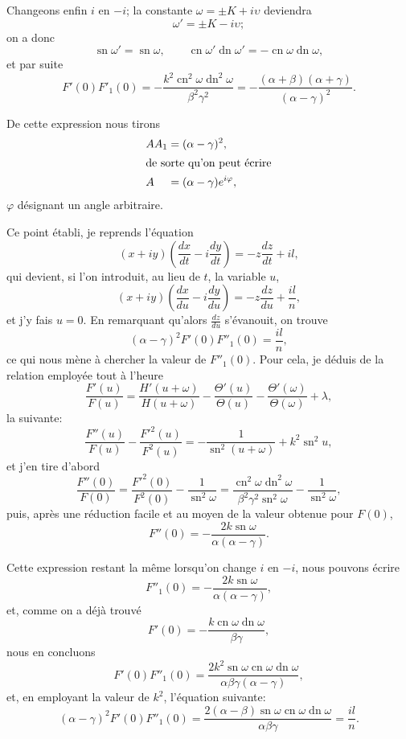 \documentclass[11pt,leqno,oneside,letterpaper]{book}[2005/09/16]
\DeclareMathOperator{\sn}{sn}
\DeclareMathOperator{\cn}{cn}
\DeclareMathOperator{\dn}{dn}
\begin{document}
Changeons enfin $i$ en $-i$; la constante $\omega = \pm K + i\upsilon$ deviendra
\[
\omega' = \pm K - i\upsilon;
\]
on a donc
\[
\sn \omega' = \sn \omega, \qquad
\cn \omega' \dn \omega' = -\cn \omega \dn \omega,
\]
et par suite
\[
F'(0) F'_1(0) = -\frac{k^2 \cn^2 \omega \dn^2 \omega}{\beta^2 \gamma^2}
              = -\frac{(\alpha + \beta)(\alpha + \gamma)}{(\alpha - \gamma)^2}.
\]

De cette expression nous tirons
\begin{align*}
  A A_1          &= (\alpha - \gamma)^2, \\
\intertext{de sorte qu'on peut \'ecrire}
  A\phantom{A_1} &= (\alpha - \gamma) e^{i \varphi},
\end{align*}
$\varphi$ d\'esignant un angle arbitraire.

Ce point \'etabli, je reprends l'\'equation
\[
(x + iy)\left( \frac{dx}{dt} - i \frac{dy}{dt} \right) = -z \frac{dz}{dt} + il,
\]
qui devient, si l'on introduit, au lieu de $t$, la variable $u$,
\[
(x + iy)\left( \frac{dx}{du} - i\frac{dy}{du} \right) = -z\frac{dz}{du} + \frac{il}{n},
\]
et j'y fais $u = 0$. En remarquant qu'alors $\frac{dz}{du}$ s'\'evanouit, on trouve
\[
(\alpha - \gamma)^2 F'(0) F''_1(0) = \frac{il}{n},
\]
ce qui nous m\`ene \`a chercher la valeur de $F''_1 (0)$. Pour cela, je d\'eduis de la
relation employ\'ee tout \`a l'heure
\[
\frac{F'(u)}{F(u)} = \frac{H'(u + \omega)}{H(u + \omega)}
    - \frac{\Theta'(u)}{\Theta(u)}
    - \frac{\Theta'(\omega)}{\Theta(\omega)} + \lambda,
\]
la suivante:
\[
\frac{F''(u)}{F(u)} - \frac{F'^2(u)}{F^2(u)} = -\frac{1}{\sn^2(u+\omega)} + k^2\sn^2 u,
\]
et j'en tire d'abord
\[
\frac{F''(0)}{F(0)} = \frac{F'^2(0)}{F^2(0)} - \frac{1}{\sn^2 \omega}
   = \frac{\cn^2 \omega \dn^2 \omega}{\beta^2 \gamma^2 \sn^2 \omega} - \frac{1}{\sn^2 \omega},
\]
puis, apr\`es une r\'eduction facile et au moyen de la valeur obtenue pour
$F(0)$,
\[
F''(0) = -\frac{2k\sn \omega}{\alpha(\alpha - \gamma)}.
\]

Cette expression restant la m\^eme lorsqu'on change $i$ en $-i$, nous pouvons
\'ecrire
\[
F''_1(0) = -\frac{2k\sn \omega}{\alpha(\alpha - \gamma)},
\]
et, comme on a d\'ej\`a trouv\'e
\[
F'(0) = -\frac{k\cn \omega \dn \omega}{\beta \gamma},
\]
nous en concluons
\[
F'(0) F''_1(0) = \frac{2k^2\sn \omega \cn \omega \dn \omega}{\alpha\beta\gamma(\alpha-\gamma)},
\]
et, en employant la valeur de $k^2$, l'\'equation suivante:
\[
(\alpha - \gamma)^2 F'(0) F''_1(0) = \frac{2(\alpha - \beta) \sn \omega \cn \omega \dn \omega}{\alpha \beta \gamma} = \frac{il}{n}.
\]
\end{document}

